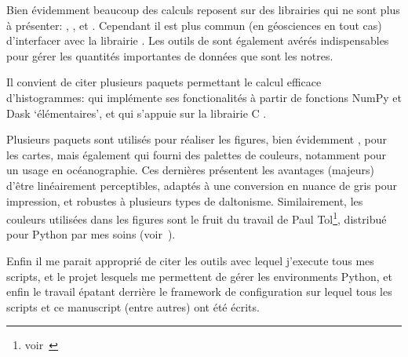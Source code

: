 Bien évidemment beaucoup des calculs reposent sur des librairies qui ne sont plus à présenter: , , et .
Cependant il est plus commun (en géosciences en tout cas) d'interfacer avec la librairie .
Les outils de  sont également avérés indispensables pour gérer les quantités importantes de données que sont les notres.

Il convient de citer plusieurs paquets permettant le calcul efficace d'histogrammes:
 qui implémente ses fonctionalités à partir de fonctions NumPy et Dask \enquote*{élémentaires}, et
 qui s'appuie sur la librairie C .

Plusieurs paquets sont utilisés pour réaliser les figures, bien évidemment ,
 pour les cartes,
mais également  qui fourni des palettes de couleurs, notamment pour un usage en océanographie. Ces dernières présentent les avantages (majeurs) d'être linéairement perceptibles, adaptés à une conversion en nuance de gris pour impression, et robustes à plusieurs types de daltonisme.
Similairement, les couleurs utilisées dans les figures sont le fruit du travail de Paul Tol\footnote{voir~}, distribué pour Python par mes soins (voir~).

Enfin il me parait approprié de citer les outils  avec lequel j'execute tous mes scripts,  et le projet  lesquels me permettent de gérer les environments Python, et enfin le travail épatant derrière le framework de configuration  sur lequel tous les scripts et ce manuscript (entre autres) ont été écrits.
